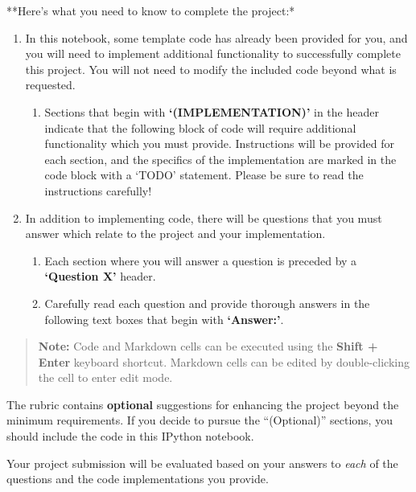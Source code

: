 \documentclass[11pt]{article}
\providecommand{\tightlist}{%
      \setlength{\itemsep}{0pt}\setlength{\parskip}{0pt}}
\begin{document}
**Here's what you need to know to complete the project:*

\begin{enumerate}
\def\labelenumi{\arabic{enumi}.}
\item
  In this notebook, some template code has already been provided for
  you, and you will need to implement additional functionality to
  successfully complete this project. You will not need to modify the
  included code beyond what is requested.

  \begin{enumerate}
  \def\labelenumii{\alph{enumii}.}
  \tightlist
  \item
    Sections that begin with \textbf{`(IMPLEMENTATION)'} in the header
    indicate that the following block of code will require additional
    functionality which you must provide. Instructions will be provided
    for each section, and the specifics of the implementation are marked
    in the code block with a `TODO' statement. Please be sure to read
    the instructions carefully!
  \end{enumerate}
\item
  In addition to implementing code, there will be questions that you
  must answer which relate to the project and your implementation.

  \begin{enumerate}
  \def\labelenumii{\alph{enumii}.}
  \item
    Each section where you will answer a question is preceded by a
    \textbf{`Question X'} header.
  \item
    Carefully read each question and provide thorough answers in the
    following text boxes that begin with \textbf{`Answer:'}.
  \end{enumerate}
\end{enumerate}

\begin{quote}
\textbf{Note:} Code and Markdown cells can be executed using the
\textbf{Shift + Enter} keyboard shortcut. Markdown cells can be edited
by double-clicking the cell to enter edit mode.
\end{quote}

The rubric contains \textbf{optional} suggestions for enhancing the
project beyond the minimum requirements. If you decide to pursue the
``(Optional)'' sections, you should include the code in this IPython
notebook.

Your project submission will be evaluated based on your answers to
\emph{each} of the questions and the code implementations you provide.
\end{document}
